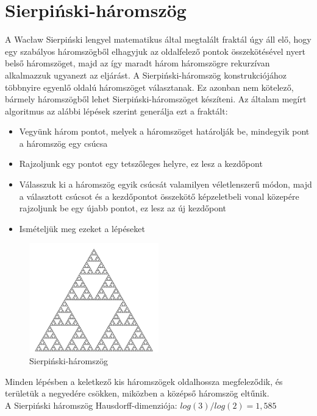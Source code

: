 \section*{Sierpiński-háromszög}
A Wacław Sierpiński lengyel matematikus által megtalált fraktál úgy áll elő, hogy egy szabályos háromszögből elhagyjuk az oldalfelező pontok összekötésével nyert belső háromszöget, majd az így maradt három háromszögre rekurzívan alkalmazzuk ugyanezt az eljárást.
A Sierpiński-háromszög konstrukciójához többnyire egyenlő oldalú háromszöget választanak. Ez azonban nem kötelező, bármely háromszögből lehet Sierpiński-háromszöget készíteni. \cite{sierp-triangle}
Az általam megírt algoritmus az alábbi lépések szerint generálja ezt a fraktált:
\begin{itemize}
\item Vegyünk három pontot, melyek a háromszöget határolják be, mindegyik pont a háromszög egy csúcsa
\item Rajzoljunk egy pontot egy tetszőleges helyre, ez lesz a kezdőpont
\item Válasszuk ki a háromszög egyik csúcsát valamilyen véletlenszerű módon, majd a választott csúcsot és a kezdőpontot összekötő képzeletbeli vonal közepére rajzoljunk be egy újabb pontot, ez lesz az új kezdőpont
\item Ismételjük meg ezeket a lépéseket
\end{itemize}
\begin{figure}[!ht]
\begin{center}
	\includegraphics[width=0.5\textwidth]{img/SierpinskiTriangle}
	\caption[labelInTOC]{Sierpiński-háromszög}
\end{center}
\end{figure}
Minden lépésben a keletkező kis háromszögek oldalhossza megfeleződik, és területük a negyedére csökken, miközben a középső háromszög eltűnik.\\
A Sierpiński háromszög Hausdorff-dimenziója: $log(3)/log(2) = 1,585$ \cite{sierp-triangle-wiki}
